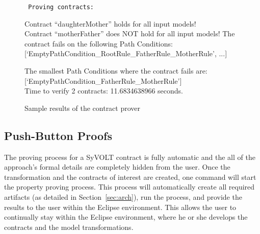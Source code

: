 

\begin{figure}

\scriptsize
\tt
Proving contracts:

Contract ``daughterMother'' holds for all input models!
\\
Contract ``motherFather'' does NOT hold for all input models! The contract fails on the following Path Conditions:
[`EmptyPathCondition\_RootRule\_FatherRule\_MotherRule', ...]

The smallest Path Conditions where the contract fails are:
[`EmptyPathCondition\_FatherRule\_MotherRule']
\\
Time to verify 2 contracts: 11.6834638966 seconds.
\caption{Sample results of the contract prover}
\label{fig:output}
\end{figure}

\subsection{Push-Button Proofs}
\label{sec:push_button_proofs}
The proving process for a SyVOLT contract is fully automatic and the all of the
approach's formal details are completely hidden from the user. Once the
transformation and the contracts of interest are created, one command will start
the property proving process. This process will automatically create all
required artifacts (as detailed in Section~\ref{sec:arch}), run the process, and
provide the results to the user within the Eclipse environment. This allows the user to continually stay within the
Eclipse environment, where he or she develops the contracts and the
model transformations.


